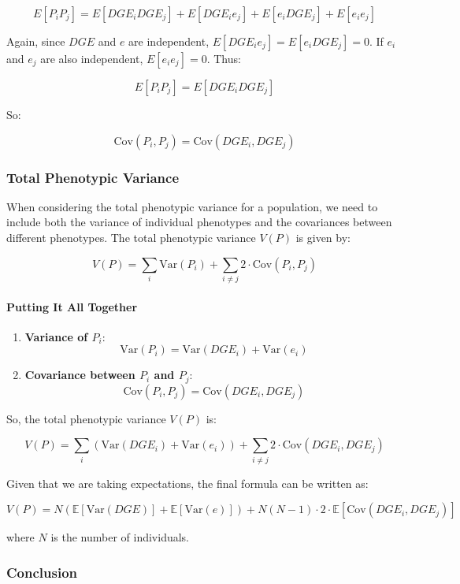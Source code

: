 \documentclass[
]{article}
\begin{document}
\[ E[P_i P_j] = E[DGE_i DGE_j] + E[DGE_i e_j] + E[e_i DGE_j] + E[e_i e_j] \]

Again, since \(DGE\) and \(e\) are independent,
\(E[DGE_i e_j] = E[e_i DGE_j] = 0\). If \(e_i\) and \(e_j\) are also
independent, \(E[e_i e_j] = 0\). Thus:

\[ E[P_i P_j] = E[DGE_i DGE_j] \]

So:

\[ \text{Cov}(P_i, P_j) = \text{Cov}(DGE_i, DGE_j) \]

\subsubsection{Total Phenotypic
Variance}\label{total-phenotypic-variance}

When considering the total phenotypic variance for a population, we need
to include both the variance of individual phenotypes and the
covariances between different phenotypes. The total phenotypic variance
\(V(P)\) is given by:

\[ V(P) = \sum_i \text{Var}(P_i) + \sum_{i \neq j} 2 \cdot \text{Cov}(P_i, P_j) \]

\paragraph{Putting It All Together}\label{putting-it-all-together}

\begin{enumerate}
\def\labelenumi{\arabic{enumi}.}
\item
  \textbf{Variance of \(P_i\)}:
  \[ \text{Var}(P_i) = \text{Var}(DGE_i) + \text{Var}(e_i) \]
\item
  \textbf{Covariance between \(P_i\) and \(P_j\)}:
  \[ \text{Cov}(P_i, P_j) = \text{Cov}(DGE_i, DGE_j) \]
\end{enumerate}

So, the total phenotypic variance \(V(P)\) is:

\[ V(P) = \sum_i \left( \text{Var}(DGE_i) + \text{Var}(e_i) \right) + \sum_{i \neq j} 2 \cdot \text{Cov}(DGE_i, DGE_j) \]

Given that we are taking expectations, the final formula can be written
as:

\[ V(P) = N \left( \mathbb{E}[\text{Var}(DGE)] + \mathbb{E}[\text{Var}(e)] \right) + N(N-1) \cdot 2 \cdot \mathbb{E}[\text{Cov}(DGE_i, DGE_j)] \]

where \(N\) is the number of individuals.

\subsubsection{Conclusion}\label{conclusion-1}
\end{document}
